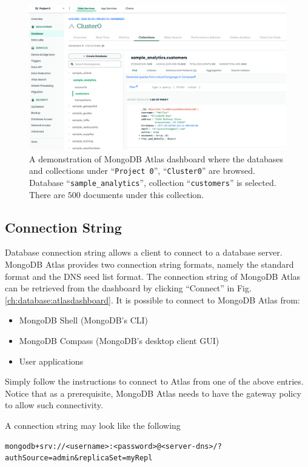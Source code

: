 \begin{figure}[htbp]
	\centering
	\includegraphics[width=\textwidth]{chapters/part-3/figures/atlas_dashboard_2.png}
	\caption{A demonstration of MongoDB Atlas dashboard where the databases and collections under ``\texttt{Project 0}'', ``\texttt{Cluster0}'' are browsed. Database ``\texttt{sample\_analytics}'', collection ``\texttt{customers}'' is selected. There are $500$ documents under this collection.} \label{ch:database:atlasdashboard2}
\end{figure}

\subsection{Connection String}

Database connection string allows a client to connect to a database server. MongoDB Atlas provides two connection string formats, namely the standard format and the DNS seed list format. The connection string of MongoDB Atlas can be retrieved from the dashboard by clicking ``Connect'' in Fig. \ref{ch:database:atlasdashboard}. It is possible to connect to MongoDB Atlas from:
\begin{itemize}
  \item MongoDB Shell (MongoDB's CLI)
  \item MongoDB Compass (MongoDB's desktop client GUI)
  \item User applications
\end{itemize}
Simply follow the instructions to connect to Atlas from one of the above entries. Notice that as a prerequisite, MongoDB Atlas needs to have the gateway policy to allow such connectivity.

A connection string may look like the following
\begin{lstlisting}
mongodb+srv://<username>:<password>@<server-dns>/?authSource=admin&replicaSet=myRepl
\end{lstlisting}


